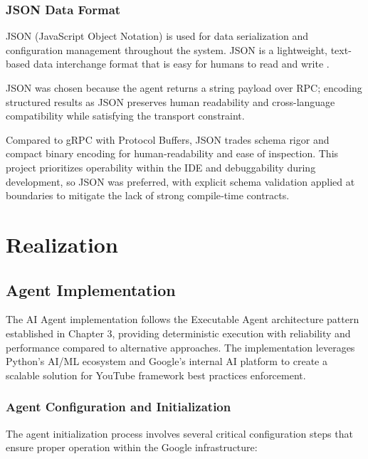 \begin{spacing}{1.2}
\subsubsection{JSON Data Format}
JSON (JavaScript Object Notation) is used for data serialization and configuration management throughout the system. JSON is a lightweight, text-based data interchange format that is easy for humans to read and write \cite{crockford2006application}.

JSON was chosen because the agent returns a string payload over RPC; encoding structured results as JSON preserves human readability and cross-language compatibility while satisfying the transport constraint.

Compared to gRPC with Protocol Buffers, JSON trades schema rigor and compact binary encoding for human‑readability and ease of inspection. This project prioritizes operability within the IDE and debuggability during development, so JSON was preferred, with explicit schema validation applied at boundaries to mitigate the lack of strong compile‑time contracts.



\section{Realization}

\subsection{Agent Implementation}
The AI Agent implementation follows the Executable Agent architecture pattern established in Chapter 3, providing deterministic execution with reliability and performance compared to alternative approaches. The implementation leverages Python's AI/ML ecosystem and Google's internal AI platform to create a scalable solution for YouTube framework best practices enforcement.


\subsubsection{Agent Configuration and Initialization}
The agent initialization process involves several critical configuration steps that ensure proper operation within the Google infrastructure:


\end{spacing}
